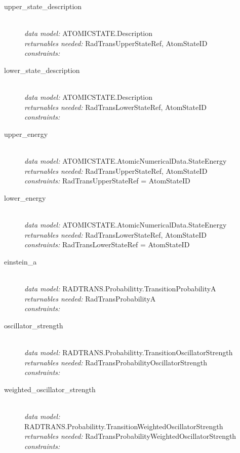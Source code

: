 \documentclass[11pt,a4paper]{ivoa}
\begin{document}
\begin{description}
	\item [upper\_state\_description]\hfill\\
	\textit{data model:} ATOMICSTATE.Description\\
	\textit{returnables needed:} RadTransUpperStateRef, AtomStateID\\
	\textit{constraints:}  

\item [lower\_state\_description]\hfill\\
	\textit{data model:} ATOMICSTATE.Description\\
	\textit{returnables needed:} RadTransLowerStateRef, AtomStateID\\
	\textit{constraints:}  

\item [upper\_energy]\hfill\\
	\textit{data model:} ATOMICSTATE.AtomicNumericalData.StateEnergy\\
	\textit{returnables needed:} RadTransUpperStateRef, AtomStateID\\
	\textit{constraints:}  RadTransUpperStateRef = AtomStateID

\item [lower\_energy]\hfill\\
	\textit{data model:} ATOMICSTATE.AtomicNumericalData.StateEnergy\\
	\textit{returnables needed:} RadTransLowerStateRef, AtomStateID\\
	\textit{constraints:}  RadTransLowerStateRef = AtomStateID

\item [einstein\_a]\hfill\\
	\textit{data model:}  RADTRANS.Probabilitty.TransitionProbabilityA\\
	\textit{returnables needed:} RadTransProbabilityA\\
	\textit{constraints:}

\item [oscillator\_strength]\hfill\\
	\textit{data model:}  RADTRANS.Probabilitty.TransitionOscillatorStrength\\
	\textit{returnables needed:} RadTransProbabilityOscillatorStrength\\
    \textit{constraints:}

\item [weighted\_oscillator\_strength]\hfill\\
	\textit{data model:}  RADTRANS.Probabilitty.TransitionWeightedOscillatorStrength\\
	\textit{returnables needed:} RadTransProbabilityWeightedOscillatorStrength\\
    \textit{constraints:}


\end{description}
\end{document}
